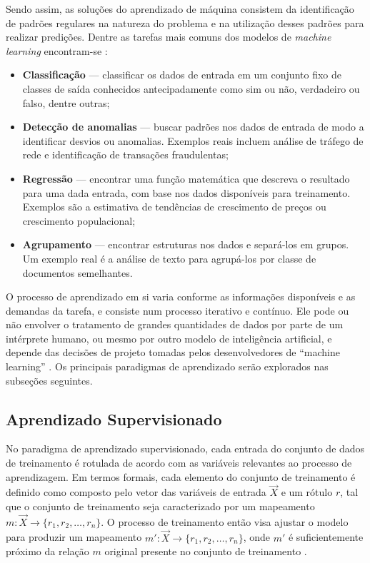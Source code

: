 \documentclass[
	12pt,				%
	openright,			%
	twoside,			%
	a4paper,			%
	tcc,			%
	]{ABNT-DC-UEL}
\begin{document}
Sendo assim, as soluções do aprendizado de máquina consistem da identificação de padrões regulares na natureza do problema e na utilização desses padrões para realizar predições. Dentre as tarefas mais comuns dos modelos de \textit{machine learning} encontram-se \cite{alzubi:18}:

\begin{itemize}
    \item \textbf{Classificação} --- classificar os dados de entrada em um conjunto fixo de classes de saída conhecidos antecipadamente como sim ou não, verdadeiro ou falso, dentre outras;
    \item \textbf{Detecção de anomalias} --- buscar padrões nos dados de entrada de modo a identificar desvios ou anomalias. Exemplos reais incluem análise de tráfego de rede e identificação de transações fraudulentas;
    \item \textbf{Regressão} --- encontrar uma função matemática que descreva o resultado para uma dada entrada, com base nos dados disponíveis para treinamento. Exemplos são a estimativa de tendências de crescimento de preços ou crescimento populacional;
    \item \textbf{Agrupamento} --- encontrar estruturas nos dados e separá-los em grupos. Um exemplo real é a análise de texto para agrupá-los por classe de documentos semelhantes.
\end{itemize}

O processo de aprendizado em si varia conforme as informações disponíveis e as demandas da tarefa, e consiste num processo iterativo e contínuo. Ele pode ou não envolver o tratamento de grandes quantidades de dados por parte de um intérprete humano, ou mesmo por outro modelo de inteligência artificial, e depende das decisões de projeto tomadas pelos desenvolvedores de ``machine learning'' \cite{alpaydin:20, sharma:21}. Os principais paradigmas de aprendizado serão explorados nas subseções seguintes.

\subsection{Aprendizado Supervisionado}

No paradigma de aprendizado supervisionado, cada entrada do conjunto de dados de treinamento é rotulada de acordo com as variáveis relevantes ao processo de aprendizagem. Em termos formais, cada elemento do conjunto de treinamento é definido como composto pelo vetor das variáveis de entrada $\Vec{X}$ e um rótulo $r$, tal que o conjunto de treinamento seja caracterizado por um mapeamento $m : \Vec{X} \to \{r_1, r_2, \dots, r_n\}$. O processo de treinamento então visa ajustar o modelo para produzir um mapeamento $m' : \Vec{X} \to \{r_1, r_2, \dots, r_n\}$, onde $m'$ é suficientemente próximo da relação $m$ original presente no conjunto de treinamento \cite{mohammed:16, alpaydin:20}.
\end{document}
